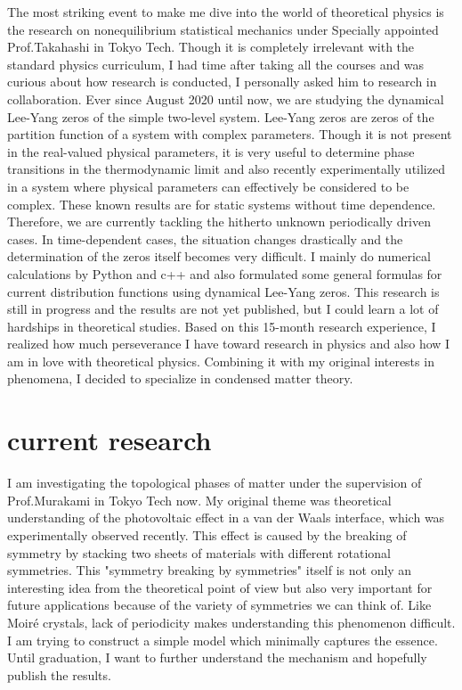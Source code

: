 \documentclass[a4]{article}
\begin{document}
The most striking event to make me dive into the world of theoretical physics is the research on nonequilibrium statistical mechanics under Specially appointed Prof.Takahashi in Tokyo Tech. Though it is completely irrelevant with the standard physics curriculum, I had time after taking all the courses and was curious about how research is conducted, I personally asked him to research in collaboration. Ever since August 2020 until now, we are studying the dynamical Lee-Yang zeros of the simple two-level system. Lee-Yang zeros are zeros of the partition function of a system with complex parameters. Though it is not present in the real-valued physical parameters, it is very useful to determine phase transitions in the thermodynamic limit and also recently experimentally utilized in a system where physical parameters can effectively be considered to be complex. These known results are for static systems without time dependence. Therefore, we are currently tackling the hitherto unknown periodically driven cases. In time-dependent cases, the situation changes drastically and the determination of the zeros itself becomes very difficult. I mainly do numerical calculations by Python and c++ and also formulated some general formulas for current distribution functions using dynamical Lee-Yang zeros. This research is still in progress and the results are not yet published, but I could learn a lot of hardships in theoretical studies. Based on this 15-month research experience, I realized how much  perseverance I have toward research in physics and also how I am in love with theoretical physics. Combining it with my original interests in phenomena, I decided to specialize in condensed matter theory.\par

\section{current research}
I am investigating the topological phases of matter under the supervision of Prof.Murakami in Tokyo Tech now. My original theme was theoretical understanding of the photovoltaic effect in a van der Waals interface, which was experimentally observed recently. This effect is caused by the breaking of symmetry by stacking two sheets of materials with different rotational symmetries. This "symmetry breaking by symmetries" itself is not only an interesting idea from the theoretical point of view but also very important for future applications because of the variety of symmetries we can think of.  Like Moir\'{e} crystals, lack of periodicity makes understanding this phenomenon difficult. I am trying to construct a simple model which minimally captures the essence. Until graduation, I want to further understand the mechanism and hopefully publish the results. \par
\end{document}
